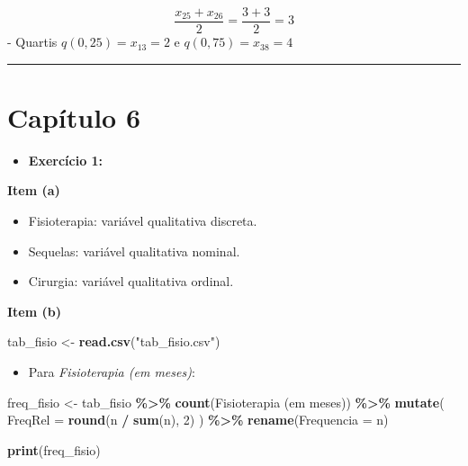 \documentclass[
]{book}
\newenvironment{Shaded}{\begin{snugshade}}{\end{snugshade}}
\newcommand{\AttributeTok}[1]{\textcolor[rgb]{0.13,0.29,0.53}{#1}}
\newcommand{\DecValTok}[1]{\textcolor[rgb]{0.00,0.00,0.81}{#1}}
\newcommand{\FunctionTok}[1]{\textcolor[rgb]{0.13,0.29,0.53}{\textbf{#1}}}
\newcommand{\NormalTok}[1]{#1}
\newcommand{\OtherTok}[1]{\textcolor[rgb]{0.56,0.35,0.01}{#1}}
\newcommand{\SpecialCharTok}[1]{\textcolor[rgb]{0.81,0.36,0.00}{\textbf{#1}}}
\newcommand{\StringTok}[1]{\textcolor[rgb]{0.31,0.60,0.02}{#1}}
\providecommand{\tightlist}{%
  \setlength{\itemsep}{0pt}\setlength{\parskip}{0pt}}
\begin{document}
\[
\frac{x_{25} + x_{26}}{2} =\frac{3 + 3}{2} = 3 
\]
- Quartis
\(q(0,25) = x_{13} = 2\) e \(q(0,75) = x_{38} = 4\)

\begin{center}\rule{0.5\linewidth}{0.5pt}\end{center}

\section{Capítulo 6}\label{capuxedtulo-6}

\begin{itemize}
\tightlist
\item
  \textbf{Exercício 1:}
\end{itemize}

\textbf{Item (a)}

\begin{itemize}
\tightlist
\item
  Fisioterapia: variável qualitativa discreta.
\item
  Sequelas: variável qualitativa nominal.
\item
  Cirurgia: variável qualitativa ordinal.
\end{itemize}

\textbf{Item (b)}

\begin{Shaded}
\begin{Highlighting}[]
\NormalTok{tab\_fisio }\OtherTok{\textless{}{-}} \FunctionTok{read.csv}\NormalTok{(}\StringTok{"tab\_fisio.csv"}\NormalTok{)}
\end{Highlighting}
\end{Shaded}

\begin{itemize}
\tightlist
\item
  Para \emph{Fisioterapia (em meses)}:
\end{itemize}

\begin{Shaded}
\begin{Highlighting}[]
\NormalTok{freq\_fisio }\OtherTok{\textless{}{-}}\NormalTok{ tab\_fisio }\SpecialCharTok{\%\textgreater{}\%}
  \FunctionTok{count}\NormalTok{(}\StringTok{\textasciigrave{}}\AttributeTok{Fisioterapia (em meses)}\StringTok{\textasciigrave{}}\NormalTok{) }\SpecialCharTok{\%\textgreater{}\%}
  \FunctionTok{mutate}\NormalTok{(}
    \AttributeTok{FreqRel =} \FunctionTok{round}\NormalTok{(n }\SpecialCharTok{/} \FunctionTok{sum}\NormalTok{(n), }\DecValTok{2}\NormalTok{)}
\NormalTok{  ) }\SpecialCharTok{\%\textgreater{}\%}
  \FunctionTok{rename}\NormalTok{(}\AttributeTok{Frequencia =}\NormalTok{ n)}

\FunctionTok{print}\NormalTok{(freq\_fisio)}
\end{Highlighting}
\end{Shaded}
\end{document}
